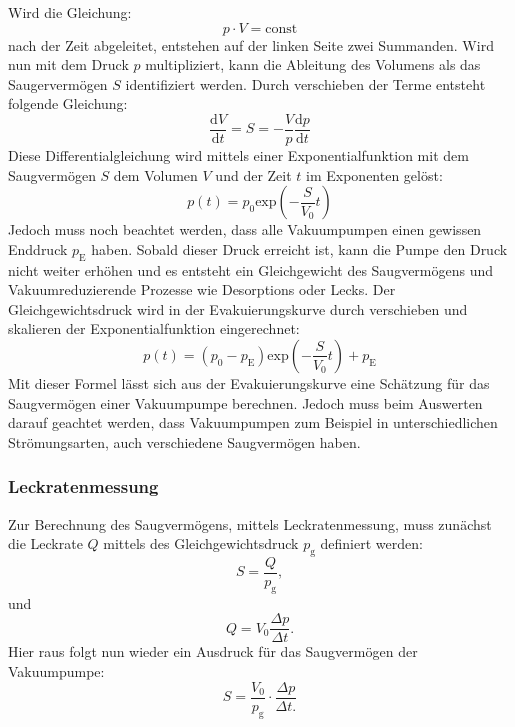 			\noindent
			Wird die Gleichung:
			\begin{equation}
				p \cdot V = \text{const}
			\end{equation}
			nach der Zeit abgeleitet, entstehen auf der linken Seite zwei Summanden. 
			Wird nun mit dem Druck $p$ multipliziert, kann die Ableitung des Volumens als das Saugervermögen $S$ identifiziert werden.
			Durch verschieben der Terme entsteht folgende Gleichung:
			\begin{equation}
				\frac{\text{d}V}{\text{d}t} = S = - \frac{V}{p} \frac{\text{d}p}{\text{d}t}
			\end{equation}
			Diese Differentialgleichung wird mittels einer Exponentialfunktion mit dem Saugvermögen $S$ dem Volumen $V$ und der Zeit $t$ im Exponenten gelöst:
			\begin{equation}
				p(t) = p_0 \text{exp}\left( - \frac{S}{V_0}t \right)
			\end{equation}
			Jedoch muss noch beachtet werden, dass alle Vakuumpumpen einen gewissen Enddruck $p_\text{E}$ haben. 
			Sobald dieser Druck erreicht ist, kann die Pumpe den Druck nicht weiter erhöhen und es entsteht ein Gleichgewicht des Saugvermögens und Vakuumreduzierende Prozesse wie Desorptions oder Lecks.
			Der Gleichgewichtsdruck wird in der Evakuierungskurve durch verschieben und skalieren der Exponentialfunktion eingerechnet:
			\begin{equation}
				p(t) = (p_0 - p_\text{E}) \text{exp}\left( - \frac{S}{V_0}t \right) + p_\text{E}
			\end{equation}
			Mit dieser Formel lässt sich aus der Evakuierungskurve eine Schätzung für das Saugvermögen einer Vakuumpumpe berechnen.
			Jedoch muss beim Auswerten darauf geachtet werden, dass Vakuumpumpen zum Beispiel in unterschiedlichen Strömungsarten, auch verschiedene Saugvermögen haben.
			
		\subsubsection{Leckratenmessung}
			
			\noindent
			Zur Berechnung des Saugvermögens, mittels Leckratenmessung, muss zunächst die Leckrate $Q$ mittels des Gleichgewichtsdruck $p_\text{g}$ definiert werden:
			\begin{equation}
				S = \frac{Q}{p_\text{g}},
			\end{equation}
			und
			\begin{equation}
				Q = V_0 \frac{\Delta p}{\Delta t}.
			\end{equation}
			Hier raus folgt nun wieder ein Ausdruck für das Saugvermögen der Vakuumpumpe:
			\begin{equation}
				S = \frac{V_0}{p_\text{g}} \cdot \frac{\Delta p}{\Delta t.}
			\end{equation}
